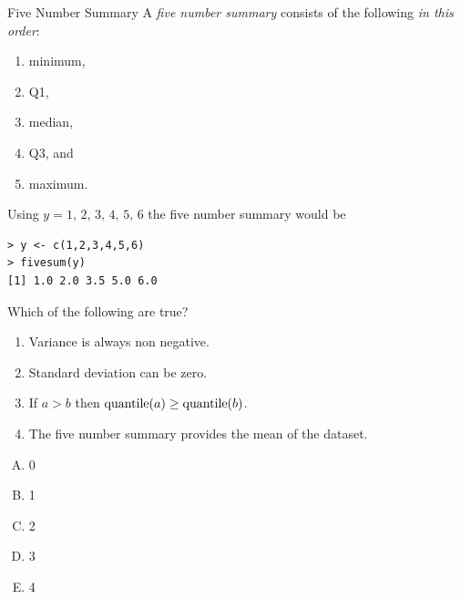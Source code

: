 \documentclass[xcolor=svgnames, 10pt]{beamer}
\begin{document}
\begin{frame}[fragile]{Five Number Summary}
A \emph{five number summary} consists of the following \emph{in this order}:
\begin{enumerate}
\item minimum,
\item Q1,
\item median,
\item Q3, and 
\item maximum.
\end{enumerate}

\begin{example}
Using $y = {1,\,2,\,3,\,4,\,5,\,6}$ the five number summary would be
\begin{verbatim}
> y <- c(1,2,3,4,5,6)
> fivesum(y)
[1] 1.0 2.0 3.5 5.0 6.0
\end{verbatim}

\end{example}
\end{frame}




\begin{frame}[fragile]
\begin{question}
Which of the following are true?
\begin{enumerate}
\item Variance is always non negative.
\item Standard deviation can be zero. 
\item If $a > b$ then ${\rm quantile}(a) \geq {\rm quantile}(b)$. 
\item The five number summary provides the mean of the dataset. 
\end{enumerate}
\begin{multicols}{5}
\begin{enumerate}[A)]
\item 0
\item 1
\item 2
\item 3
\item 4
\end{enumerate}
\end{multicols}
\end{question}
\end{frame}
\end{document}
